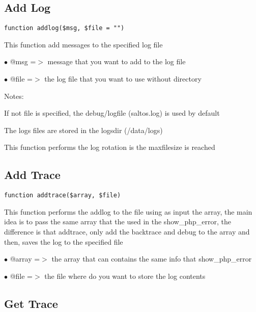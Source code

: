 \documentclass[a4paper]{book}
\begin{document}
\hypertarget{toc196}{}
\subsection{Add Log}

\begin{lstlisting}
function addlog($msg, $file = "")
\end{lstlisting}

This function add messages to the specified log file

\begin{compactitem}
\item[\color{myblue}$\bullet$] @msg  =$>$ message that you want to add to the log file
\item[\color{myblue}$\bullet$] @file =$>$ the log file that you want to use without directory
\end{compactitem}

Notes:

If not file is specified, the debug/logfile (saltos.log) is used by default

The logs files are stored in the logsdir (/data/logs)

This function performs the log rotation is the maxfilesize is reached

\hypertarget{toc197}{}
\subsection{Add Trace}

\begin{lstlisting}
function addtrace($array, $file)
\end{lstlisting}

This function performs the addlog to the file using as input the array, the
main idea is to pass the same array that the used in the show\_php\_error, the
difference is that addtrace, only add the backtrace and debug to the array
and then, saves the log to the specified file

\begin{compactitem}
\item[\color{myblue}$\bullet$] @array =$>$ the array that can contains the same info that show\_php\_error
\item[\color{myblue}$\bullet$] @file  =$>$ the file where do you want to store the log contents
\end{compactitem}

\hypertarget{toc198}{}
\subsection{Get Trace}
\end{document}
